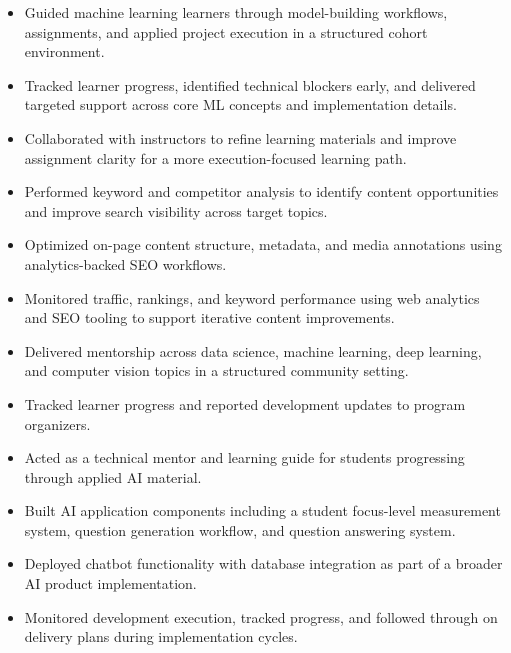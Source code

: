 
\begin{itemize}
  \item Guided machine learning learners through model-building workflows, assignments, and applied project execution in a structured cohort environment.
  \item Tracked learner progress, identified technical blockers early, and delivered targeted support across core ML concepts and implementation details.
  \item Collaborated with instructors to refine learning materials and improve assignment clarity for a more execution-focused learning path.
\end{itemize}

\begin{itemize}
  \item Performed keyword and competitor analysis to identify content opportunities and improve search visibility across target topics.
  \item Optimized on-page content structure, metadata, and media annotations using analytics-backed SEO workflows.
  \item Monitored traffic, rankings, and keyword performance using web analytics and SEO tooling to support iterative content improvements.
\end{itemize}

\newpage
{}
\begin{itemize}
  \item Delivered mentorship across data science, machine learning, deep learning, and computer vision topics in a structured community setting.
  \item Tracked learner progress and reported development updates to program organizers.
  \item Acted as a technical mentor and learning guide for students progressing through applied AI material.
\end{itemize}

\begin{itemize}
  \item Built AI application components including a student focus-level measurement system, question generation workflow, and question answering system.
  \item Deployed chatbot functionality with database integration as part of a broader AI product implementation.
  \item Monitored development execution, tracked progress, and followed through on delivery plans during implementation cycles.
\end{itemize}
